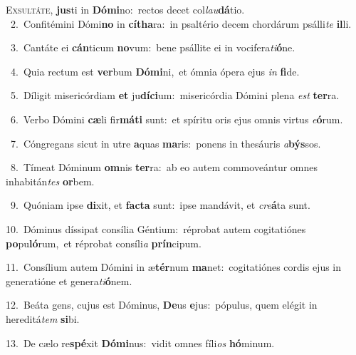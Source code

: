 \lettrine{\initial\textcolor{\initialcolor}{E}}{xsultáte,} \textbf{jus}\-ti in \textbf{Dó}\-\textbf{mi}no:~\star rectos decet col\-\textit{lau}\-\textbf{dá}tio.\\
{\numbfont\textcolor{\numbcolor}{~2.}}~Confitémini Dómi\textbf{no} in \textbf{cí}\-\textbf{tha}ra:~\star in psaltério decem chordárum psálli\textit{te} \textbf{il}\-li.\par
{\numbfont\textcolor{\numbcolor}{~3.}}~Cantáte ei \textbf{cán}\-ticum \textbf{no}\-vum:~\star bene psállite ei in vocifera\-\textit{ti}\-\textbf{ó}ne.\par
{\numbfont\textcolor{\numbcolor}{~4.}}~Quia rectum est \textbf{ver}\-bum \textbf{Dó}\-\textbf{mi}ni,~\star et ómnia ópera ejus \textit{in} \textbf{fi}\-de.\par
{\numbfont\textcolor{\numbcolor}{~5.}}~Díligit misericórdiam \textbf{et} ju\-\textbf{dí}\-\textbf{ci}um:~\star misericórdia Dómini plena \textit{est} \textbf{ter}\-ra.\par
{\numbfont\textcolor{\numbcolor}{~6.}}~Verbo Dómini \textbf{cæ}\-li fir\-\textbf{má}\-\textbf{ti} sunt:~\star et spíritu oris ejus omnis virtus \textit{e}\-\textbf{ó}rum.\par
{\numbfont\textcolor{\numbcolor}{~7.}}~Cóngregans sicut in utre \textbf{a}\-quas \textbf{ma}\-ris:~\star ponens in thesáuris \textit{a}\-\textbf{býs}sos.\par
{\numbfont\textcolor{\numbcolor}{~8.}}~Tímeat Dóminum \textbf{om}\-nis \textbf{ter}\-ra:~\star ab eo autem commoveántur omnes inhabitán\textit{tes} \textbf{or}\-bem.\par
{\numbfont\textcolor{\numbcolor}{~9.}}~Quóniam ipse \textbf{di}\-xit, et \textbf{fac}\-\textbf{ta} sunt:~\star ipse mandávit, et \textit{cre}\-\textbf{á}ta sunt.\par
{\numbfont\textcolor{\numbcolor}{10.}}~Dóminus díssipat consília Géntium:~\dagger réprobat autem cogitatiónes \textbf{po}\-pu\-\textbf{ló}\-rum,~\star et réprobat consíli\textit{a} \textbf{prín}\-cipum.\par
{\numbfont\textcolor{\numbcolor}{11.}}~Consílium autem Dómini in æ\-\textbf{tér}\-num \textbf{ma}\-net:~\star cogitatiónes cordis ejus in generatióne et genera\-\textit{ti}\-\textbf{ó}nem.\par
{\numbfont\textcolor{\numbcolor}{12.}}~Beáta gens, cujus est Dóminus, \textbf{De}\-us \textbf{e}\-jus:~\star pópulus, quem elégit in hereditá\textit{tem} \textbf{si}\-bi.\par
{\numbfont\textcolor{\numbcolor}{13.}}~De cælo re\-\textbf{spé}\-xit \textbf{Dó}\-\textbf{mi}nus:~\star vidit omnes fíli\textit{os} \textbf{hó}\-minum.\par
